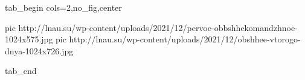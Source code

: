  
 
 
 
 


\ifcmt
  tab_begin cols=2,no_fig,center

     pic http://lnau.su/wp-content/uploads/2021/12/pervoe-obbshhekomandzhnoe-1024x575.jpg
		 pic http://lnau.su/wp-content/uploads/2021/12/obshhee-vtorogo-dnya-1024x726.jpg

  tab_end
\fi

